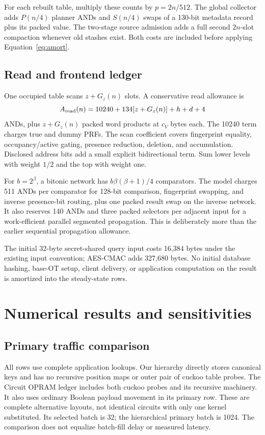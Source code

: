 \documentclass[11pt]{article}
\begin{document}
For each rebuilt table, multiply these counts by $p=2n/512$. The global
collector adds $P(n/4)$ planner ANDs and $S(n/4)$ swaps of a 130-bit
metadata record plus its packed value. The two-stage source admission
adds a full second $2n$-slot compaction whenever old stashes exist.
Both costs are included before applying Equation~\eqref{eq:amort}.

\subsection{Read and frontend ledger}
One occupied table scans $z+G_z(n)$ slots. A conservative read allowance is
\begin{equation}\label{eq:read}
 A_{\rm read}(n)=10240+134[z+G_z(n)]+h+d+4
\end{equation}
ANDs, plus $z+G_z(n)$ packed word products at $c_V$ bytes each. The
10240 term charges true and dummy PRFs. The scan coefficient covers
fingerprint equality, occupancy/active gating, presence reduction, deletion,
and accumulation. Disclosed address bits add a small explicit bidirectional
term. Sum lower levels with weight $1/2$ and the top with weight one.

For $b=2^\beta$, a bitonic network has
$b\beta(\beta+1)/4$ comparators. The model charges 511 ANDs per comparator
for 128-bit comparison, fingerprint swapping, and inverse presence-bit
routing, plus one packed result swap on the inverse network. It also
reserves 140 ANDs and three packed selectors per adjacent input for a
work-efficient parallel segmented propagation. This is deliberately more
than the earlier sequential propagation allowance.

The initial 32-byte secret-shared query input costs 16,384 bytes under
the existing input convention; AES-CMAC adds 327,680 bytes. No initial
database hashing, base-OT setup, client delivery, or application computation
on the result is amortized into the steady-state rows.

\section{Numerical results and sensitivities}\label{sec:results}
\subsection{Primary traffic comparison}
All rows use complete application lookups. Our hierarchy directly stores
canonical keys and has no recursive position maps or outer pair of cuckoo
table probes. The Circuit OPRAM ledger includes both cuckoo probes and its
recursive machinery. It also uses ordinary Boolean payload movement in
its primary row. These are complete alternative layouts, not identical
circuits with only one kernel substituted. Its selected batch is 32;
the hierarchical primary batch is 1024. The comparison does not equalize
batch-fill delay or measured latency.
\end{document}
